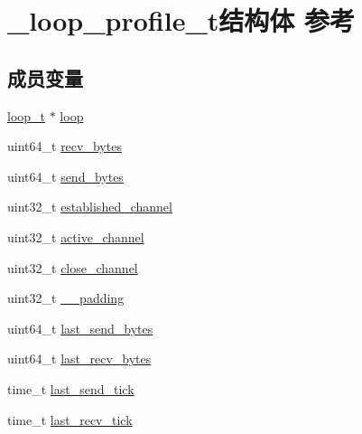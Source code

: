 \hypertarget{a00031}{}\section{\+\_\+loop\+\_\+profile\+\_\+t结构体 参考}
\label{a00031}
\subsection*{成员变量}
\begin{DoxyCompactItemize}
\item 
\hyperlink{a00051_a9c3ad1cd2de83e09f3a7b59fa82c94ee_a9c3ad1cd2de83e09f3a7b59fa82c94ee}{loop\+\_\+t} $\ast$ \hyperlink{a00031_a980ff537ba150044fae36b625ad23461_a980ff537ba150044fae36b625ad23461}{loop}
\item 
uint64\+\_\+t \hyperlink{a00031_a65c0413fffa7982e7a7c99e630e2d94b_a65c0413fffa7982e7a7c99e630e2d94b}{recv\+\_\+bytes}
\item 
uint64\+\_\+t \hyperlink{a00031_a1c6ce181c5e47d5aa0692e380dae50b9_a1c6ce181c5e47d5aa0692e380dae50b9}{send\+\_\+bytes}
\item 
uint32\+\_\+t \hyperlink{a00031_a14f2e0a88263ec993c3422f496c6df95_a14f2e0a88263ec993c3422f496c6df95}{established\+\_\+channel}
\item 
uint32\+\_\+t \hyperlink{a00031_aea9f252921f18ca335ca244adcbc1f94_aea9f252921f18ca335ca244adcbc1f94}{active\+\_\+channel}
\item 
uint32\+\_\+t \hyperlink{a00031_a30be05315677dc2d0ddf42811832f7c6_a30be05315677dc2d0ddf42811832f7c6}{close\+\_\+channel}
\item 
uint32\+\_\+t \hyperlink{a00031_a47cbcecd9e5d3bb3688de5912a875d3b_a47cbcecd9e5d3bb3688de5912a875d3b}{\+\_\+\+\_\+padding}
\item 
uint64\+\_\+t \hyperlink{a00031_afdea29d3429c7aa8b40da4275ba97461_afdea29d3429c7aa8b40da4275ba97461}{last\+\_\+send\+\_\+bytes}
\item 
uint64\+\_\+t \hyperlink{a00031_a63c0674ce1803ad482ee9b1eaa341537_a63c0674ce1803ad482ee9b1eaa341537}{last\+\_\+recv\+\_\+bytes}
\item 
time\+\_\+t \hyperlink{a00031_af099b515fd8af145f73e2c0f34f9b2d8_af099b515fd8af145f73e2c0f34f9b2d8}{last\+\_\+send\+\_\+tick}
\item 
time\+\_\+t \hyperlink{a00031_a3b6534102a76073064474ccc8897a964_a3b6534102a76073064474ccc8897a964}{last\+\_\+recv\+\_\+tick}
\end{DoxyCompactItemize}


